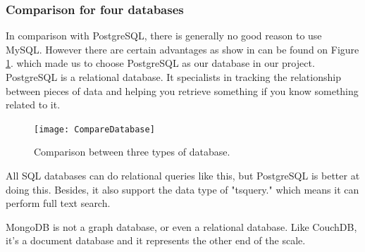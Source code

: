 \subsubsection{Comparison for four databases}
In comparison with PostgreSQL, there is generally no good reason to use MySQL. 
However there are certain advantages as show in can be found on Figure \ref{CompareDatabase}. which made us to choose PostgreSQL as our database in our project.
PostgreSQL is a relational database. It specialists in tracking the relationship between pieces of data 
and helping you retrieve something if you know something related to it.

\begin{figure}[htb]
	\begin{center}
		\texttt{[image: CompareDatabase]}
	\end{center}
	\caption{Comparison between three types of database.\label{CompareDatabase}}
\end{figure}
\newpage

All SQL databases can do relational queries like this, but PostgreSQL is better at doing this. 
Besides, it also support the data type of "tsquery." which means it can perform full text search.


MongoDB is not a graph database, or even a relational database. 
Like CouchDB, it's a document database and it represents the other end of the scale. 

